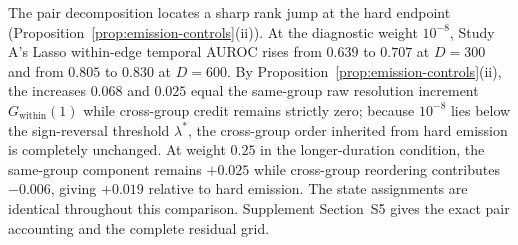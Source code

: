 The pair decomposition locates a sharp rank jump at the hard endpoint
(Proposition~\ref{prop:emission-controls}(ii)). At the
diagnostic weight $10^{-8}$, Study A's Lasso within-edge temporal AUROC
rises from $0.639$ to $0.707$ at $D=300$ and from $0.805$ to $0.830$
at $D=600$. By Proposition~\ref{prop:emission-controls}(ii), the increases
$0.068$ and $0.025$ equal the same-group raw resolution increment
$G_{\mathrm{within}}(1)$ while cross-group credit remains strictly zero;
because $10^{-8}$ lies below the sign-reversal threshold $\lambda^*$, the
cross-group order inherited from hard emission is completely unchanged.
At weight $0.25$ in the longer-duration condition, the same-group component
remains $+0.025$ while cross-group reordering contributes $-0.006$, giving
$+0.019$ relative to hard emission. The state assignments are identical
throughout this comparison. Supplement Section~S5 gives the exact pair
accounting and the complete residual grid.
